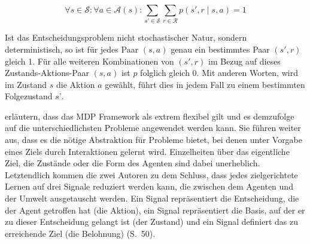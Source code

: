 \begin{equation}\label{eq:wahrscheinlichkeitsverteilung}
    \forall s \in \mathcal{S}: \forall a \in \mathcal{A}(s):
\sum_{s' \in \mathcal{S}} \sum_{r \in \mathcal{R}} p(s', r \mid s,a) = 1 
\end{equation}

Ist das Entscheidungsproblem nicht stochastischer Natur, sondern deterministisch, so ist für jedes Paar $(s,a)$ genau ein bestimmtes Paar $(s',r)$ gleich 1. Für alle weiteren Kombinationen von $(s',r)$ im Bezug auf dieses Zustands-Aktions-Paar $(s,a)$ ist $p$ folglich gleich 0. Mit anderen Worten, wird im Zustand $s$ die Aktion $a$ gewählt, führt dies in jedem Fall zu einem bestimmten Folgezustand $s’$. 
\par 

\cite{Sutton1998} erläutern, dass das MDP Framework als extrem flexibel gilt und es demzufolge auf die unterschiedlichsten Probleme angewendet werden kann. Sie führen weiter aus, dass es die nötige Abstraktion für Probleme bietet, bei denen unter Vorgabe eines Ziels durch Interaktionen gelernt wird. Einzelheiten über das eigentliche Ziel, die Zustände oder die Form des Agenten sind dabei unerheblich. 
Letztendlich kommen die zwei Autoren zu dem Schluss, dass \glqq jedes zielgerichtete Lernen auf drei Signale reduziert werden kann, die zwischen dem Agenten und der Umwelt ausgetauscht werden. Ein Signal repräsentiert die Entscheidung, die der Agent getroffen hat (die Aktion), ein Signal repräsentiert die Basis, auf der er zu dieser Entscheidung gelangt ist (der Zustand) und ein Signal definiert das zu erreichende Ziel (die Belohnung)\grqq{} (S.~50).

